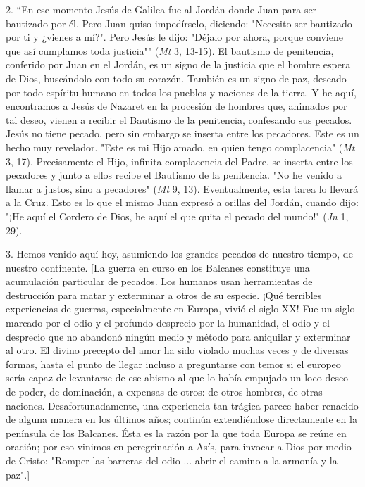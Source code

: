 \begin{body}
2. ``En ese momento Jesús de Galilea fue al Jordán donde Juan para ser bautizado por él. Pero Juan quiso impedírselo, diciendo: "Necesito ser bautizado por ti y ¿vienes a mí?". Pero Jesús le dijo: "Déjalo por ahora, porque conviene que así cumplamos toda justicia"" (\emph{Mt} 3, 13-15). El bautismo de penitencia, conferido por Juan en el Jordán, es un signo de la justicia que el hombre espera de Dios, buscándolo con todo su corazón. También es un signo de paz, deseado por todo espíritu humano en todos los pueblos y naciones de la tierra. Y he aquí, encontramos a Jesús de Nazaret en la procesión de hombres que, animados por tal deseo, vienen a recibir el Bautismo de la penitencia, confesando sus pecados. Jesús no tiene pecado, pero sin embargo se inserta entre los pecadores. Este es un hecho muy revelador. "Este es mi Hijo amado, en quien tengo complacencia" (\emph{Mt} 3, 17). Precisamente el Hijo, infinita complacencia del Padre, se inserta entre los pecadores y junto a ellos recibe el Bautismo de la penitencia. "No he venido a llamar a justos, sino a pecadores" (\emph{Mt} 9, 13). Eventualmente, esta tarea lo llevará a la Cruz. Esto es lo que el mismo Juan expresó a orillas del Jordán, cuando dijo: "¡He aquí el Cordero de Dios, he aquí el que quita el pecado del mundo!" (\emph{Jn} 1, 29).

3. Hemos venido aquí hoy, asumiendo los grandes pecados de nuestro tiempo, de nuestro continente. {[}La guerra en curso en los Balcanes constituye una acumulación particular de pecados. Los humanos usan herramientas de destrucción para matar y exterminar a otros de su especie. ¡Qué terribles experiencias de guerras, especialmente en Europa, vivió el siglo XX! Fue un siglo marcado por el odio y el profundo desprecio por la humanidad, el odio y el desprecio que no abandonó ningún medio y método para aniquilar y exterminar al otro. El divino precepto del amor ha sido violado muchas veces y de diversas formas, hasta el punto de llegar incluso a preguntarse con temor si el europeo sería capaz de levantarse de ese abismo al que lo había empujado un loco deseo de poder, de dominación, a expensas de otros: de otros hombres, de otras naciones. Desafortunadamente, una experiencia tan trágica parece haber renacido de alguna manera en los últimos años; continúa extendiéndose directamente en la península de los Balcanes. Ésta es la razón por la que toda Europa se reúne en oración; por eso vinimos en peregrinación a Asís, para invocar a Dios por medio de Cristo: "Romper las barreras del odio ... abrir el camino a la armonía y la paz".{]}


\end{body}

